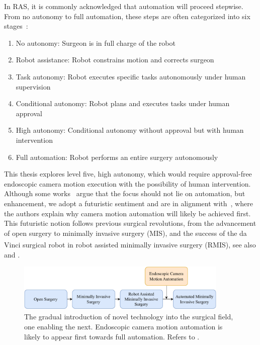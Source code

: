 In RAS, it is commonly acknowledged that automation will proceed stepwise. From no autonomy to full automation, these steps are often categorized into six stages~\cite{zhang2017automation, fosch2021human}:
\begin{enumerate}
    \item No autonomy: Surgeon is in full charge of the robot
    \item Robot assistance: Robot constrains motion and corrects surgeon  
    \item Task autonomy: Robot executes specific tasks autonomously under human supervision
    \item Conditional autonomy: Robot plans and executes tasks under human approval
    \item High autonomy: Conditional autonomy without approval but with human intervention
    \item Full automation: Robot performs an entire surgery autonomously
\end{enumerate}
This thesis explores level five, high autonomy, which would require approval-free endoscopic camera motion execution with the possibility of human intervention. Although some works~\cite{battaglia2021rethinking} argue that the focus should not lie on automation, but enhancement, we adopt a futuristic sentiment and are in alignment with~\cite{kitaguchi2022artificial}, where the authors explain why camera motion automation will likely be achieved first. This futuristic notion follows previous surgical revolutions, from the advancement of open surgery to minimally invasive surgery (MIS), and the success of the da Vinci\textsuperscript{\textregistered} surgical robot in robot assisted minimally invasive surgery (RMIS), see also  and .
\begin{figure}[b]
    \centering
    \includegraphics[width=0.9\textwidth]{introduction/fig/24_02_13_surgical_revolution.pdf}
    \caption{The gradual introduction of novel technology into the surgical field, one enabling the next. Endoscopic camera motion automation is likely to appear first towards full automation. Refers to .}
    \label{in:fig:camera_motion_automation}
\end{figure}

